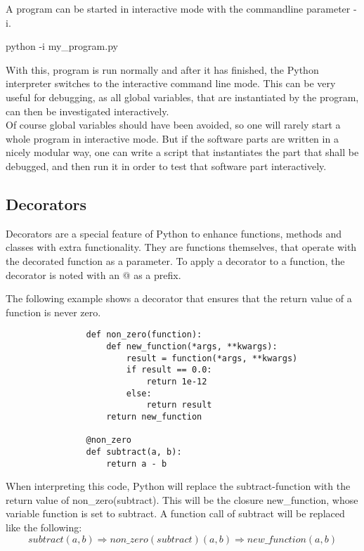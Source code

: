 			A program can be started in interactive mode with the commandline parameter {\normalfont \ttfamily -i}.
			\begin{center}
				{\normalfont \ttfamily python -i my\_program.py}
			\end{center}
			With this, program is run normally and after it has finished, the Python interpreter switches to the interactive command line mode.
			This can be very useful for debugging, as all global variables, that are instantiated by the program, can then be investigated interactively.\\
			Of course global variables should have been avoided, so one will rarely start a whole program in interactive mode.
			But if the software parts are written in a nicely modular way, one can write a script that instantiates the part that shall be debugged, and then run it in order to test that software part interactively.

		\subsection{Decorators}
			\label{Decorators}
			Decorators are a special feature of Python to enhance functions, methods and classes with extra functionality.
			They are functions themselves, that operate with the decorated function as a parameter.
			To apply a decorator to a function, the decorator is noted with an {\normalfont \ttfamily @} as a prefix.

			The following example shows a decorator that ensures that the return value of a function is never zero.
			\begin{verbatim}
				def non_zero(function):
					def new_function(*args, **kwargs):
						result = function(*args, **kwargs)
						if result == 0.0:
							return 1e-12
						else:
							return result
					return new_function

				@non_zero
				def subtract(a, b):
					return a - b
			\end{verbatim}
			When interpreting this code, Python will replace the {\normalfont \ttfamily subtract}-function with the return value of {\normalfont \ttfamily non\_zero(subtract)}.
			This will be the closure {\normalfont \ttfamily new\_function}, whose variable {\normalfont \ttfamily function} is set to {\normalfont \ttfamily subtract}.
			A function call of {\normalfont \ttfamily subtract} will be replaced like the following:
			\begin{equation}
				subtract(a, b) \Rightarrow non\_zero(subtract)(a, b) \Rightarrow new\_function(a, b)
			\end{equation}

